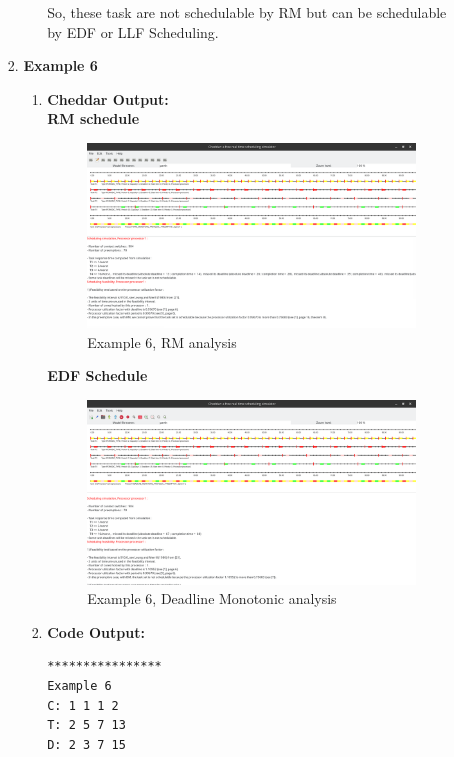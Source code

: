\documentclass[a4paper,11pt]{article}%
\newenvironment{qanda}{\setlength{\parindent}{0pt}}{\bigskip}
\begin{document}
\begin{qanda}
\begin{enumerate}
\begin{enumerate}
\begin{enumerate}
\begin{enumerate}
						                  So, these task are not schedulable by RM but can be schedulable by EDF or LLF Scheduling.
					            \end{enumerate}
					      \item \textbf{Example 6}
					            \begin{enumerate}
						            \item \textbf{Cheddar Output:}\\
						                  \textbf{RM schedule}
						                  \begin{figure}[H]
							                  \centering
							                  \includegraphics[scale=0.36]{figures/ex6_rm.png}
							                  \caption{Example 6, RM analysis}
						                  \end{figure}
						                  \textbf{EDF Schedule}
						                  \begin{figure}[H]
							                  \centering
							                  \includegraphics[scale=0.36]{figures/ex6_dm.png}
							                  \caption{Example 6, Deadline Monotonic analysis}
						                  \end{figure}
						            \item \textbf{Code Output:}\\
						                  \begin{verbatim}
****************
Example 6
C: 1 1 1 2
T: 2 5 7 13
D: 2 3 7 15


\end{verbatim}
\end{enumerate}
\end{enumerate}
\end{enumerate}
\end{enumerate}
\end{qanda}
\end{document}
